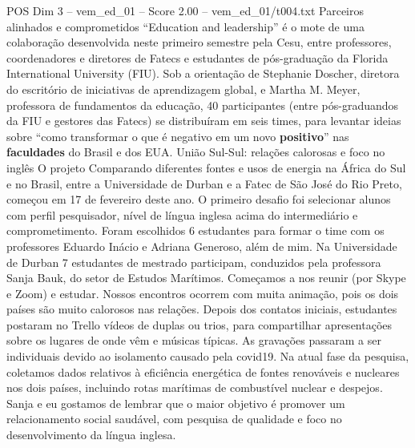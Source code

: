 \begin{textsample}{POS Dim 3 – vem\_ed\_01 – Score 2.00 – vem\_ed\_01/t004.txt}  \label{ex:f3_pos_119}
Parceiros alinhados e comprometidos “Education and leadership” é o mote de uma colaboração desenvolvida neste primeiro semestre pela Cesu, entre professores, coordenadores e diretores de Fatecs e estudantes de pós-graduação da Florida International University (FIU).
Sob a orientação de Stephanie Doscher, diretora do escritório de iniciativas de aprendizagem global, e Martha M.
Meyer, professora de fundamentos da educação, 40 participantes (entre pós-graduandos da FIU e gestores das Fatecs) se distribuíram em seis times, para levantar ideias sobre “como transformar o que é negativo em um novo \textbf{positivo}” nas \textbf{faculdades} do Brasil e dos EUA.
União Sul-Sul: relações calorosas e foco no inglês O projeto Comparando diferentes fontes e usos de energia na África do Sul e no Brasil, entre a Universidade de Durban e a Fatec de São José do Rio Preto, começou em 17 de fevereiro deste ano.
O primeiro desafio foi selecionar alunos com perfil pesquisador, nível de língua inglesa acima do intermediário e comprometimento.
Foram escolhidos 6 estudantes para formar o time com os professores Eduardo Inácio e Adriana Generoso, além de mim.
Na Universidade de Durban 7 estudantes de mestrado participam, conduzidos pela professora Sanja Bauk, do setor de Estudos Marítimos.
Começamos a nos reunir (por Skype e Zoom) e estudar.
Nossos encontros ocorrem com muita animação, pois os dois países são muito calorosos nas relações.
Depois dos contatos iniciais, estudantes postaram no Trello vídeos de duplas ou trios, para compartilhar apresentações sobre os lugares de onde vêm e músicas típicas.
As gravações passaram a ser individuais devido ao isolamento causado pela covid19.
Na atual fase da pesquisa, coletamos dados relativos à eficiência energética de fontes renováveis e nucleares nos dois países, incluindo rotas marítimas de combustível nuclear e despejos.
Sanja e eu gostamos de lembrar que o maior objetivo é promover um relacionamento social saudável, com pesquisa de qualidade e foco no desenvolvimento da língua inglesa.

\end{textsample}
